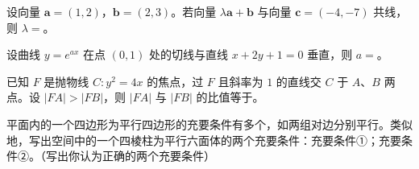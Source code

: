\begin{question}
设向量 $\boldsymbol a=(1,2)$，$\boldsymbol b=(2,3)$。若向量 $\lambda\boldsymbol a+\boldsymbol b$ 与向量 $\boldsymbol c=(-4,-7)$ 共线，则 $\lambda=$\gkblank{}。

\end{question}
\begin{question}
设曲线 $y=e^{ax}$ 在点 $(0,1)$ 处的切线与直线 $x+2y+1=0$ 垂直，则 $a=$\gkblank{}。

\end{question}
\begin{question}
已知 $F$ 是抛物线 $C:y^2=4x$ 的焦点，过 $F$ 且斜率为 $1$ 的直线交 $C$ 于 $A\text{、}B$ 两点。设 $|FA|>|FB|$，则 $|FA|$ 与 $|FB|$ 的比值等于\gkblank{}。

\end{question}
\begin{question}
平面内的一个四边形为平行四边形的充要条件有多个，如两组对边分别平行。类似地，写出空间中的一个四棱柱为平行六面体的两个充要条件：充要条件①\gkblank{}；充要条件②\gkblank{}。（写出你认为正确的两个充要条件）

\end{question}

